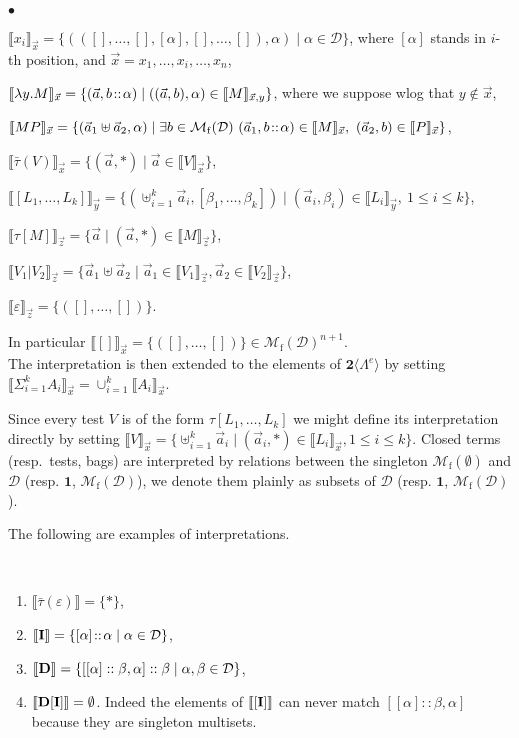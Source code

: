 \documentclass{LMCS}
\newcommand{\one}{\mathbf{1}}
\newcommand{\bool}{\mathbf{2}}
\newcommand{\st}{ \mid }
\newcommand{\paral}{\vert}
\newcommand{\Set}[1]{\Lambda^{#1}}
\newcommand{\sums}[1]{\bool\langle\Set{#1}\rangle}
\newcommand{\Int}[1]{\llbracket #1\rrbracket} \newcommand{\trm}[1]{#1^{\textrm{--}}}
\newcommand{\Mfin}[1]{\mathcal{M}_{\mathrm{f}}(#1)}
\newcommand{\mcup}{\uplus}
\newcommand{\seq}[1]{\vec{#1}}
\newcommand{\gt}{\ensuremath{\tau}}
\newcommand{\gto}{\ensuremath{\bar\tau}}
\newcommand{\cD}{\mathcal{D}}
\begin{document}
\begin{iteMize}{$\bullet$}
\item $\Int{x_i}_{\seq x} = \{(([],\ldots,[],[\alpha],[],\ldots,[]),\alpha) \st \alpha \in \cD\}$, where $[\alpha]$ stands in $i$-th position, and
 $\seq x = x_1,\ldots,x_i,\ldots,x_n$,
\item $\Int{\lambda y.M}_{\seq x} = \{(\seq{a},b\at \alpha) \st ((\seq a,b), \alpha)\in\Int{M}_{\seq x,y}\}$, where we suppose wlog that $y\notin\seq x$,
\item $\Int{MP}_{\seq x} = \{ (\seq a_1 \mcup \seq a_2,\alpha) \st \exists b \in \Mfin\cD\  (\seq a_1,b \at \alpha)\in \Int{M}_{\seq x},\
(\seq a_2,b)\in\Int{P}_{\seq x}\}$,
\item $\Int{\gto(V)}_{\seq x} = \{ (\seq{a},*)\st \seq a\in\Int{V}_{\seq x}\}$,
\item $\Int{[L_1,\ldots,L_k]}_{\seq y} = \{ (\mcup_{i=1}^k \seq a_i,[\beta_1,\ldots,\beta_k]) \st (\seq a_i,\beta_i)\in \Int{L_i}_{\seq y},\ 1\le i\le k\}$,
\item $\Int{\gt[M]}_{\seq z} = \{\seq{a} \st (\seq{a}, *)\in\Int{M}_{\seq z}\}$,
\item $\Int{V_1\paral V_2}_{\seq z} = \{\seq a_1\mcup \seq a_2 \st \seq a_1\in\Int{V_1}_{\seq z}, \seq a_2\in\Int{V_2}_{\seq z}\}$,
\item $\Int{\varepsilon}_{\seq z} = \{ ([],\ldots,[]) \}$.
\end{iteMize}
In particular $\Int{[]}_{\seq x} = \{([],\ldots,[])\}\in\Mfin{\cD}^{n+1}$. \\

The interpretation is then extended to the elements of $\sums{e}$ by setting 
$\Int{\Sigma_{i=1}^k A_i}_{\seq x} = \cup_{i=1}^k \Int{A_i}_{\seq x}$.

\begin{rem} 
Since every test $V$ is of the form $\gt[L_1,\ldots,L_k]$ we might define its interpretation directly by setting
$\Int{V}_{\seq x} = \{ \mcup_{i=1}^k \seq a_i \st (\seq a_i,*)\in \Int{L_i}_{\seq x}, 1\le i \le k\}$.
Closed terms (resp.\ tests, bags)  are interpreted by relations between the singleton $\Mfin{\emptyset}$ and $\cD$ (resp. $\one$, $\Mfin{\cD}$),
we denote them plainly as subsets of $\cD$ (resp. $\one$, $\Mfin{\cD}$).
\end{rem}

The following are examples of interpretations.
\begin{exa}\label{ex:interp}\
\begin{enumerate}[1.]
\item\label{ex:interp1} $\Int{\gto(\varepsilon)} = \{*\}$,
\item\label{ex:interp2} $\Int{\bold{I}} = \{[\alpha]\at\alpha \st \alpha \in \cD \}$,
\item\label{ex:interp3} $\Int{\bold{D}}=\{ [[\alpha]::\beta,\alpha]::\beta\st\alpha,\beta\in {\cD} \}$,
\item\label{ex:interp4} $\Int{\bold{D}[\bold{I}]}=\emptyset$. Indeed the elements of $\Int{[\bold{I}]}$ can never match $[[\alpha]::\beta,\alpha]$ because they are singleton multisets.
\end{enumerate}
\end{exa}
\end{document}
